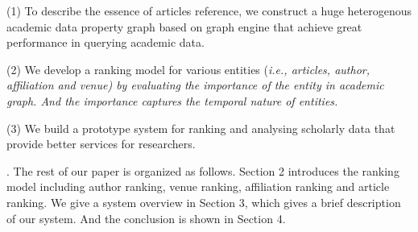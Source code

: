 \noindent (1) To describe the essence of articles reference, we construct a huge heterogenous academic data property graph based on graph engine that achieve great performance in querying academic data.

\noindent (2) We develop a ranking model for various entities (\itshape i.e., \upshape articles, author, affiliation and venue) by evaluating the importance of the entity in academic graph. And the importance captures the temporal nature of entities.

\noindent (3) We build a prototype system for ranking and analysing scholarly data that provide better services for researchers.


.
The rest of our paper is organized as follows. Section 2 introduces the ranking model including author ranking, venue ranking, affiliation ranking and article ranking. We give a system overview in Section 3, which gives a brief description of our system. And the conclusion is shown in Section 4.
